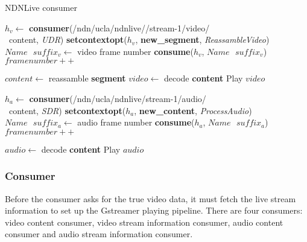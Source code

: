 \begin{algorithm}[hbt]
\caption{NDNLive consumer}
\label{alg:liveconsumer}
\begin{algorithmic}[2]
\State $h_v \leftarrow $ \textbf{consumer}(/ndn/ucla/ndnlive//stream-1/video/\\\ content, \textit{UDR})
\State \textbf{setcontextopt}($h_v$, \textbf{new\_segment}, \textit{ReassambleVideo})
\vspace{0.2cm}
	\State $Name \textbf{ } suffix_v \leftarrow $ video frame number
	\State \textbf{consume}($h_v$, $Name\textbf{ }suffix_v$)
	\State $framenumber ++$
	\EndWhile
\vspace{0.2cm}

    \State $content \leftarrow $ reassamble \textbf{segment}
		\State $video \leftarrow $ decode \textbf{content}
	   	\State Play $video$
	\EndIf
\EndFunction

\vspace{0.4cm}

\State $h_a \leftarrow $ \textbf{consumer}(/ndn/ucla/ndnlive/stream-1/audio/\\\ content, \textit{SDR})
\State \textbf{setcontextopt}($h_a$, \textbf{new\_content}, \textit{ProcessAudio})
\vspace{0.2cm}
	\State $Name \textbf{ } suffix_a \leftarrow $ audio frame number
	\State \textbf{consume}($h_a$, $Name\textbf{ }suffix_a$)
	\State $framenumber ++$
	\EndWhile
\vspace{0.2cm}

   	\State $audio \leftarrow $ decode \textbf{content}
   	\State Play $audio$
\EndFunction
\end{algorithmic}
\end{algorithm}

\subsubsection{Consumer}
\label{ssub:ndnlive_con}
Before the consumer asks for the true video data, it must fetch the live stream information to set up the Gstreamer playing pipeline. There are four consumers: video content consumer, video stream information consumer, audio content consumer and audio stream information consumer. 

